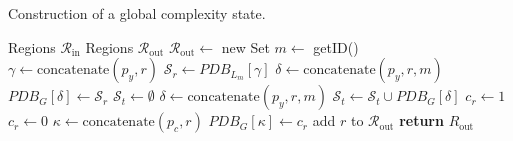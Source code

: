 \documentclass[../../main.tex]{subfiles}
\begin{document}
\begin{algorithm}
   \caption[Complexity estimation of a region]{Construction of a global complexity state.}
   \label{alg:complexity_estimation}

   \begin{algorithmic}[1]
         \REQUIRE Regions $\mathcal{R}_{\text{in}}$
         \ENSURE Regions $\mathcal{R}_{\text{out}}$
         \STATE $\mathcal{R}_{\text{out}} \leftarrow $ new Set
         \STATE $m \leftarrow$ getID() 
            \STATE $\gamma \leftarrow \text{concatenate}(p_y, r)$
            \STATE $\mathcal{S}_r \leftarrow PDB_{L_m}[\gamma]$
            \STATE $\delta \leftarrow \text{concatenate}(p_y, r, m)$
            \STATE $PDB_G[\delta] \leftarrow \mathcal{S}_r$
            \STATE $\mathcal{S}_t \leftarrow \emptyset$
               \STATE $\delta \leftarrow \text{concatenate}(p_y, r, m)$
               \STATE $\mathcal{S}_t \leftarrow \mathcal{S}_t \cup PDB_G[\delta]$
            \ENDFOR
               \STATE $c_r \leftarrow 1$ 
            \ELSE 
               \STATE $c_r \leftarrow 0$ 
            \ENDIF
            \STATE $\kappa \leftarrow \text{concatenate}(p_c, r)$
               \STATE $PDB_G[\kappa] \leftarrow c_r$
               \STATE add $r$ to $\mathcal{R}_{\text{out}}$
            \ENDIF
         \ENDFOR
         \STATE \textbf{return} $R_{\text{out}}$
   \end{algorithmic}
\end{algorithm}
\end{document}
